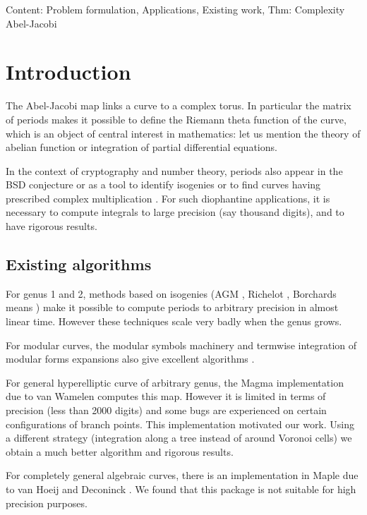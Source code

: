 \documentclass[main.tex]{subfiles}
\begin{document}
  Content: Problem formulation, Applications, Existing work, Thm: Complexity Abel-Jacobi

  \section{Introduction}

  The Abel-Jacobi map links a curve to a complex torus.
  In particular the matrix of periods makes it possible to define the Riemann
  theta function of the curve, which is an object of central interest in
  mathematics: let us
  mention the theory of abelian function or integration of partial differential
  equations.

  In the context of cryptography and number theory, periods also appear
  in the BSD conjecture or as a tool to identify isogenies or to find
  curves having prescribed complex multiplication \cite{vanWamelen06}.
  For such diophantine applications, it is necessary to compute
  integrals to large precision (say thousand digits), and to have
  rigorous results.

  \subsection{Existing algorithms}

  For genus 1 and 2, methods based on isogenies (AGM \cite{CremonaAGM13},
  Richelot \cite{BostMestre88}, Borchards means \cite{Labrande16})
  make it possible to compute periods to arbitrary precision in almost
  linear time. However these techniques scale very badly when the genus grows.

  For modular curves, the modular symbols machinery and termwise integration of
  modular forms expansions also give excellent algorithms
  \cite[sec 3.2]{Mascot13}.

  For general hyperelliptic curve of arbitrary genus, the Magma implementation
  due to van Wamelen \cite{vanWamelen06} computes this map.
  However it is limited in terms of precision (less
  than 2000 digits) and some bugs are experienced on
  certain configurations of branch points. This implementation motivated our
  work. Using a different strategy
  (integration along a tree instead of around Voronoi cells)
  we obtain a much better algorithm and rigorous results.

  For completely general algebraic curves, there is an implementation in Maple
  due to van Hoeij and Deconinck \cite{DeconinckvanHoeij01}.
  We found that this package is not suitable for high precision purposes.
\end{document}
